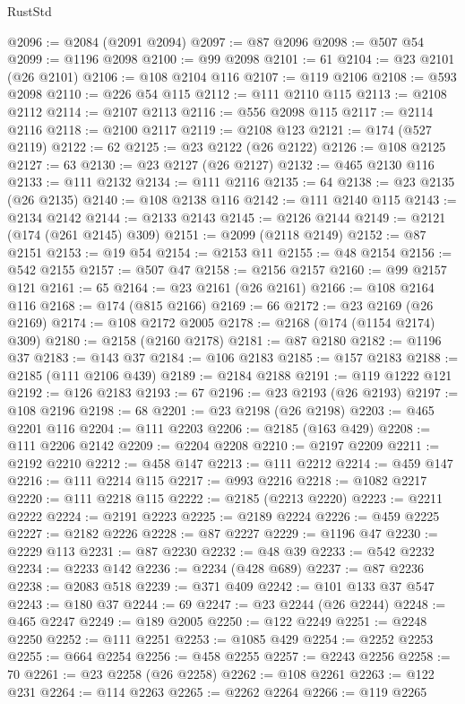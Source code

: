 \begin{lexlean}{RustStd}
\begin{coremodule}
@2096 := @2084 (@2091 @2094)
@2097 := @87 @2096
@2098 := @507 @54
@2099 := @1196 @2098
@2100 := @99 @2098
@2101 := 61
@2104 := @23 @2101 (@26 @2101)
@2106 := @108 @2104 @116
@2107 := @119 @2106
@2108 := @593 @2098
@2110 := @226 @54 @115
@2112 := @111 @2110 @115
@2113 := @2108 @2112
@2114 := @2107 @2113
@2116 := @556 @2098 @115
@2117 := @2114 @2116
@2118 := @2100 @2117
@2119 := @2108 @123
@2121 := @174 (@527 @2119)
@2122 := 62
@2125 := @23 @2122 (@26 @2122)
@2126 := @108 @2125
@2127 := 63
@2130 := @23 @2127 (@26 @2127)
@2132 := @465 @2130 @116
@2133 := @111 @2132
@2134 := @111 @2116
@2135 := 64
@2138 := @23 @2135 (@26 @2135)
@2140 := @108 @2138 @116
@2142 := @111 @2140 @115
@2143 := @2134 @2142
@2144 := @2133 @2143
@2145 := @2126 @2144
@2149 := @2121 (@174 (@261 @2145) @309)
@2151 := @2099 (@2118 @2149)
@2152 := @87 @2151
@2153 := @19 @54
@2154 := @2153 @11
@2155 := @48 @2154
@2156 := @542 @2155
@2157 := @507 @47
@2158 := @2156 @2157
@2160 := @99 @2157 @121
@2161 := 65
@2164 := @23 @2161 (@26 @2161)
@2166 := @108 @2164 @116
@2168 := @174 (@815 @2166)
@2169 := 66
@2172 := @23 @2169 (@26 @2169)
@2174 := @108 @2172 @2005
@2178 := @2168 (@174 (@1154 @2174) @309)
@2180 := @2158 (@2160 @2178)
@2181 := @87 @2180
@2182 := @1196 @37
@2183 := @143 @37
@2184 := @106 @2183
@2185 := @157 @2183
@2188 := @2185 (@111 @2106 @439)
@2189 := @2184 @2188
@2191 := @119 @1222 @121
@2192 := @126 @2183
@2193 := 67
@2196 := @23 @2193 (@26 @2193)
@2197 := @108 @2196
@2198 := 68
@2201 := @23 @2198 (@26 @2198)
@2203 := @465 @2201 @116
@2204 := @111 @2203
@2206 := @2185 (@163 @429)
@2208 := @111 @2206 @2142
@2209 := @2204 @2208
@2210 := @2197 @2209
@2211 := @2192 @2210
@2212 := @458 @147
@2213 := @111 @2212
@2214 := @459 @147
@2216 := @111 @2214 @115
@2217 := @993 @2216
@2218 := @1082 @2217
@2220 := @111 @2218 @115
@2222 := @2185 (@2213 @2220)
@2223 := @2211 @2222
@2224 := @2191 @2223
@2225 := @2189 @2224
@2226 := @459 @2225
@2227 := @2182 @2226
@2228 := @87 @2227
@2229 := @1196 @47
@2230 := @2229 @113
@2231 := @87 @2230
@2232 := @48 @39
@2233 := @542 @2232
@2234 := @2233 @142
@2236 := @2234 (@428 @689)
@2237 := @87 @2236
@2238 := @2083 @518
@2239 := @371 @409
@2242 := @101 @133 @37 @547
@2243 := @180 @37
@2244 := 69
@2247 := @23 @2244 (@26 @2244)
@2248 := @465 @2247
@2249 := @189 @2005
@2250 := @122 @2249
@2251 := @2248 @2250
@2252 := @111 @2251
@2253 := @1085 @429
@2254 := @2252 @2253
@2255 := @664 @2254
@2256 := @458 @2255
@2257 := @2243 @2256
@2258 := 70
@2261 := @23 @2258 (@26 @2258)
@2262 := @108 @2261
@2263 := @122 @231
@2264 := @114 @2263
@2265 := @2262 @2264
@2266 := @119 @2265

\end{coremodule}
\end{lexlean}
